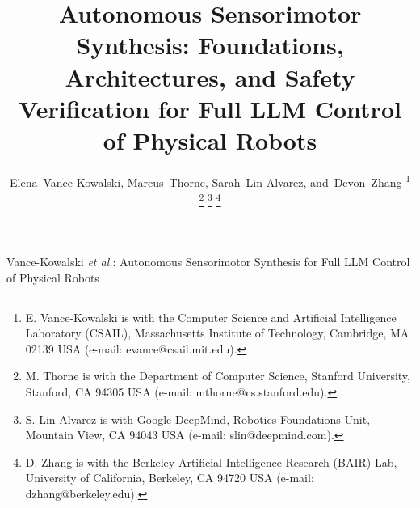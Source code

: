\documentclass[lettersize,journal]{IEEEtran}
\begin{document}
\title{Autonomous Sensorimotor Synthesis: Foundations, Architectures, and Safety Verification for Full LLM Control of Physical Robots}

\author{Elena~Vance-Kowalski, Marcus~Thorne, Sarah~Lin-Alvarez, and~Devon~Zhang
\thanks{E. Vance-Kowalski is with the Computer Science and Artificial Intelligence Laboratory (CSAIL), Massachusetts Institute of Technology, Cambridge, MA 02139 USA (e-mail: evance@csail.mit.edu).}
\thanks{M. Thorne is with the Department of Computer Science, Stanford University, Stanford, CA 94305 USA (e-mail: mthorne@cs.stanford.edu).}
\thanks{S. Lin-Alvarez is with Google DeepMind, Robotics Foundations Unit, Mountain View, CA 94043 USA (e-mail: slin@deepmind.com).}
\thanks{D. Zhang is with the Berkeley Artificial Intelligence Research (BAIR) Lab, University of California, Berkeley, CA 94720 USA (e-mail: dzhang@berkeley.edu).}
}

%
{Vance-Kowalski \MakeLowercase{\textit{et al.}}: Autonomous Sensorimotor Synthesis for Full LLM Control of Physical Robots}

\maketitle
\end{document}
